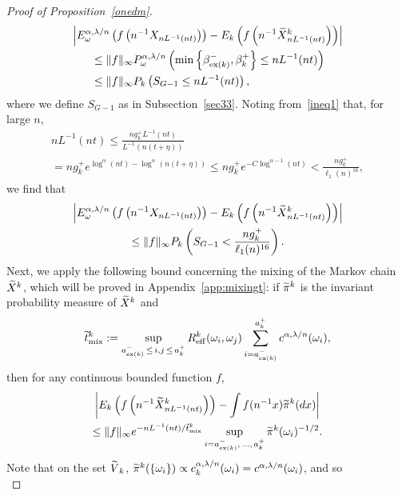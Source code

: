 \documentclass[10pt]{amsart}
\theoremstyle{definition}\newtheorem{defi}[theo]{Definition}\newtheorem{rema}[theo]{Remark}\newtheorem{exam}[theo]{Example}\newtheorem{exem}[theo]{Example}\newtheorem{nota}[theo]{Notation}
\newcommand{\mix}{\mathrm{mix}}
\newcommand{\eff}{\mathrm{eff}}
\newcommand\ex{\operatorname{ex}}
\newcommand{\aat}[1]{a_{\ex(#1)}^-}
\newcommand{\betat}[1]{\beta^-_{\ex(#1)}}
\newcommand{\B}{{16}}
\let\oldtilde\tilde
\renewcommand*{\tilde}[1]{\mathchoice{\widetilde{#1}}{\widetilde{#1}}{\oldtilde{#1}}{\oldtilde{#1}}}
\begin{document}
\begin{proof}[Proof of Proposition~\ref{onedm}]
\begin{multline*}
\left|{E}^{\alpha,\lambda/n}_\omega\left(f\left(n^{-1}{X}_{nL^{-1}(nt)}\right)\right)-E_k\left(f\left(n^{-1}\tilde{X}^k_{nL^{-1}(nt)}\right)\right)\right|\\
\begin{aligned}
&\leq \|f\|_\infty{P}^{\alpha,\lambda/n}_\omega\left(\min\left\{\betat{k},{\beta}_k^+\right\}\leq nL^{-1}(nt)\right)\\
&\leq \|f\|_\infty{P}_k\left(S_{G-1}\leq nL^{-1}(nt)\right),
\end{aligned}
\end{multline*}
where we define $S_{G-1}$ as in Subsection~\ref{sec33}. Noting from~\eqref{ineq1} that, for large $n$,
\begin{multline}\label{lntbound}
nL^{-1}(nt)\leq\frac{ng_k^+L^{-1}(nt)}{L^{-1}(n(t+\eta))}\\
=ng_k^+e^{\log^\alpha(nt)-\log^\alpha(n(t+\eta))}\leq ng_k^+e^{-C\log^{\alpha-1}(nt)}< \frac{ng_k^+}{\ell_1(n)^{\B}},
\end{multline}
we find that
\begin{multline}\label{abound}
\left|{E}^{\alpha,\lambda/n}_\omega\left(f\left(n^{-1}{X}_{nL^{-1}(nt)}\right)\right)-E_k\left(f\left(n^{-1}\tilde{X}^k_{nL^{-1}(nt)}\right)\right)\right|\\
\leq\|f\|_\infty{P}_k\left(S_{G-1}<\frac{ng_k^+}{\ell_1(n)^{\B}}\right).
\end{multline}
Next, we apply the following bound concerning the mixing of the Markov chain $\tilde{X}^k$, which will be proved in Appendix~\ref{app:mixingt}: if $\tilde{\pi}^k$ is the invariant probability measure of $\tilde{X}^k$ and
\begin{align*}
\tilde{t}^k_{\mix}:=\sup_{\aat{k}\,\leq\,i,j\,\leq\,a_k^+}R_\eff^k(\omega_i,\omega_j) \sum_{i=\aat{k}}^{a_k^+}c^{\alpha,\lambda/n}(\omega_i),
\end{align*}
then for any continuous bounded function $f$,
\begin{multline}\label{mixingt}
\left|E_k\left(f\left(n^{-1}\tilde{X}^k_{nL^{-1}(nt)}\right)\right)-\int f(n^{-1}x)\tilde{\pi}^k(dx)\right|\\
\leq \|f\|_\infty e^{-nL^{-1}(nt)/\tilde{t}^k_{\mix}}\sup_{i=\aat{k},\,\dots,\,a_k^+} \tilde \pi^k(\omega_i)^{-1/2}.
\end{multline}
Note that on the set $\tilde{V}_k$, $\tilde{\pi}^k(\{\omega_i\})\propto c^{\alpha,\lambda/n}_k(\omega_i)= c^{\alpha,\lambda/n}(\omega_i)$, and so
\begin{equation}\label{measureeq}

\end{equation}
\end{proof}
\end{document}
